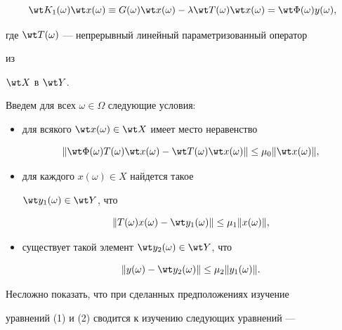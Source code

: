 \begin{equation}


\wt K_1(\omega)\wt x(\omega)\equiv G(\omega)\wt x(\omega)-


\lambda\wt T(\omega)\wt x(\omega)=\wt\Phi(\omega)y(\omega),


\end{equation}


где $\wt T(\omega)$ --- непрерывный линейный параметризованный оператор


из


$\wt X$ в $\wt Y$.





Введем для всех $\omega\in\Omega$ следующие условия:


\begin{itemize}


\item[1)] для всякого $\wt x(\omega)\in\wt X$ имеет место неравенство


\begin{equation}


\|\wt\Phi(\omega)T(\omega)\wt x(\omega)-\wt T(\omega)


\wt x(\omega)\|\le\mu_0\|\wt x(\omega)\|,


\end{equation}


\item[2)] для каждого $x(\omega)\in X$ найдется такое


$\wt y_1(\omega)\in\wt Y$, что


\begin{equation}


\|T(\omega)x(\omega)-\wt y_1(\omega)\|\le\mu_1\|x(\omega)\|,


\end{equation}


\item[3)] существует такой элемент $\wt y_2(\omega)\in\wt Y$, что


\begin{equation}


\|y(\omega)-\wt y_2(\omega)\|\le\mu_2\|y_1(\omega)\|.


\end{equation}


\end{itemize}


Несложно показать, что при сделанных предположениях изучение


уравнений (1) и (2) сводится к изучению следующих уравнений ---


